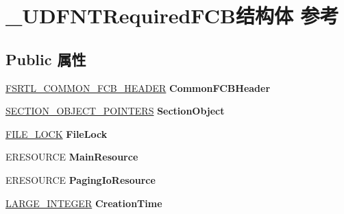 \hypertarget{struct___u_d_f_n_t_required_f_c_b}{}\section{\+\_\+\+U\+D\+F\+N\+T\+Required\+F\+C\+B结构体 参考}
\label{struct___u_d_f_n_t_required_f_c_b}
\subsection*{Public 属性}
\begin{DoxyCompactItemize}
\item 
\mbox{\label{struct___u_d_f_n_t_required_f_c_b_ae1fcbd3d64c5d9e5af6842b60bd77684}} 
\hyperlink{struct___f_s_r_t_l___c_o_m_m_o_n___f_c_b___h_e_a_d_e_r}{F\+S\+R\+T\+L\+\_\+\+C\+O\+M\+M\+O\+N\+\_\+\+F\+C\+B\+\_\+\+H\+E\+A\+D\+ER} {\bfseries Common\+F\+C\+B\+Header}
\item 
\mbox{\label{struct___u_d_f_n_t_required_f_c_b_ad23e993ef9de93163cf4b694704215f4}} 
\hyperlink{struct___s_e_c_t_i_o_n___o_b_j_e_c_t___p_o_i_n_t_e_r_s}{S\+E\+C\+T\+I\+O\+N\+\_\+\+O\+B\+J\+E\+C\+T\+\_\+\+P\+O\+I\+N\+T\+E\+RS} {\bfseries Section\+Object}
\item 
\mbox{\label{struct___u_d_f_n_t_required_f_c_b_a9406e058c30d570a4330ecd536a2171e}} 
\hyperlink{struct___f_i_l_e___l_o_c_k}{F\+I\+L\+E\+\_\+\+L\+O\+CK} {\bfseries File\+Lock}
\item 
\mbox{\label{struct___u_d_f_n_t_required_f_c_b_a12362cb6a3f2268e92ac95b06cab4650}} 
E\+R\+E\+S\+O\+U\+R\+CE {\bfseries Main\+Resource}
\item 
\mbox{\label{struct___u_d_f_n_t_required_f_c_b_a78f9c43380449165a938225a6762d2c1}} 
E\+R\+E\+S\+O\+U\+R\+CE {\bfseries Paging\+Io\+Resource}
\item 
\mbox{\label{struct___u_d_f_n_t_required_f_c_b_a01768630ddba9de981cf7621256363fc}} 
\hyperlink{union___l_a_r_g_e___i_n_t_e_g_e_r}{L\+A\+R\+G\+E\+\_\+\+I\+N\+T\+E\+G\+ER} {\bfseries Creation\+Time}
\item 

\end{DoxyCompactItemize}
